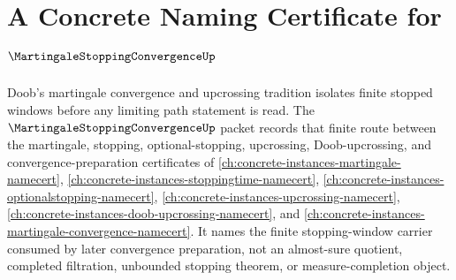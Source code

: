 \chapter{A Concrete Naming Certificate for $\MartingaleStoppingConvergenceUp$}
\label{ch:concrete-instances-martingale-stopping-convergence-namecert}

Doob's martingale convergence and upcrossing tradition isolates finite stopped windows before any limiting path statement is read. The $\MartingaleStoppingConvergenceUp$ packet records that finite route between the martingale, stopping, optional-stopping, upcrossing, Doob-upcrossing, and convergence-preparation certificates of \autoref{ch:concrete-instances-martingale-namecert}, \autoref{ch:concrete-instances-stoppingtime-namecert}, \autoref{ch:concrete-instances-optionalstopping-namecert}, \autoref{ch:concrete-instances-upcrossing-namecert}, \autoref{ch:concrete-instances-doob-upcrossing-namecert}, and \autoref{ch:concrete-instances-martingale-convergence-namecert}. It names the finite stopping-window carrier consumed by later convergence preparation, not an almost-sure quotient, completed filtration, unbounded stopping theorem, or measure-completion object.

